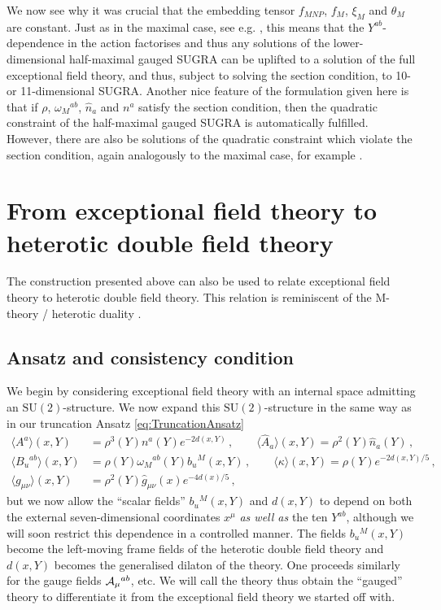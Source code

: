 \documentclass{PoS}
\newcommand{\SU}[1]{\mathrm{SU}( #1 )}
\newcommand{\TA}{{\cal A}}
\begin{document}
We now see why it was crucial that the embedding tensor $f_{MNP}$, $f_M$, $\xi_M$ and $\theta_M$ are constant. Just as in the maximal case, see e.g. \cite{Hohm:2014qga}, this means that the $Y^{ab}$-dependence in the action factorises and thus any solutions of the lower-dimensional half-maximal gauged SUGRA can be uplifted to a solution of the full exceptional field theory, and thus, subject to solving the section condition, to 10- or 11-dimensional SUGRA. Another nice feature of the formulation given here is that if $\rho$, $\omega_M{}^{ab}$, $\hat{n}_a$ and $n^a$ satisfy the section condition, then the quadratic constraint of the half-maximal gauged SUGRA is automatically fulfilled. However, there are also be solutions of the quadratic constraint which violate the section condition, again analogously to the maximal case, for example \cite{Grana:2012rr,Lee:2015xga}.

\section{From exceptional field theory to heterotic double field theory}\label{s:Het}
The construction presented above can also be used to relate exceptional field theory to heterotic double field theory. This relation is reminiscent of the M-theory / heterotic duality \cite{Malek:2016vsh}.

\subsection{Ansatz and consistency condition}
We begin by considering exceptional field theory with an internal space admitting an $\SU{2}$-structure. We now expand this $\SU{2}$-structure in the same way as in our truncation Ansatz \eqref{eq:TruncationAnsatz}
\begin{equation}
 \begin{split}
  \langle A^a\rangle(x,Y) &= \rho^3(Y) n^a(Y) e^{-2d(x,Y)} \,, \qquad \langle\hat{A}_a\rangle(x,Y) = \rho^2(Y) \hat{n}_a(Y) \,, \\
  \langle B_u{}^{ab}\rangle(x,Y) &= \rho(Y) \omega_M{}^{ab}(Y) b_u{}^M(x,Y) \,, \qquad \langle\kappa\rangle(x,Y) = \rho(Y) e^{-2d(x,Y)/5} \,, \\
  \langle g_{\mu\nu}\rangle(x,Y) &= \rho^{2}(Y) \hat{g}_{\mu\nu}(x) e^{-4d(x)/5} \,,
 \label{eq:HetTruncationAnsatz}
 \end{split}
\end{equation}
but we now allow the ``scalar fields'' $b_u{}^M(x,Y)$ and $d(x,Y)$ to depend on both the external seven-dimensional coordinates $x^\mu$ \emph{as well as} the ten $Y^{ab}$, although we will soon restrict this dependence in a controlled manner. The fields $b_u{}^M(x,Y)$ become the left-moving frame fields of the heterotic double field theory and $d(x,Y)$ becomes the generalised dilaton of the theory. One proceeds similarly for the gauge fields $\TA_\mu{}^{ab}$, etc. We will call the theory thus obtain the ``gauged'' theory to differentiate it from the exceptional field theory we started off with.
\end{document}
